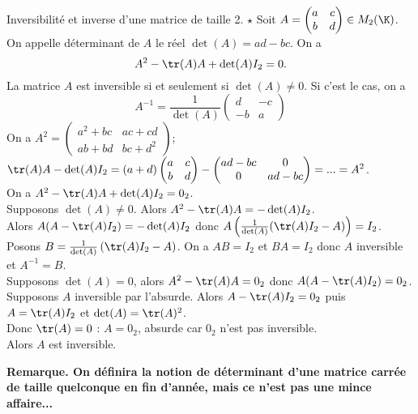 \documentclass[11pt]{article}
\begin{document}
\begin{prop}{Inversibilité et inverse d'une matrice de taille 2. $\star$}{}
    Soit $A=\begin{pmatrix}a&c\\b&d\end{pmatrix}\in M_2(\K)$. On appelle déterminant de $A$ le réel $\det(A)=ad-bc$. On a
    \begin{equation*}
        A^2-\tr(A)A+\det(A)I_2=0.
    \end{equation*}
    La matrice $A$ est inversible si et seulement si $\det(A)\neq0$. Si c'est le cas, on a
    \begin{equation*}
        A^{-1}=\frac{1}{\det(A)}\begin{pmatrix}d&-c\\-b&a\end{pmatrix}
    \end{equation*}
    \tcblower
    On a $A^2=\begin{pmatrix}a^2+bc&ac+cd\\ab+bd&bc+d^2\end{pmatrix}$; ~ $\tr(A)A-\det(A)I_2=(a+d)\begin{pmatrix}a&c\\b&d\end{pmatrix}-\begin{pmatrix}ad-bc&0\\0&ad-bc\end{pmatrix}=...=A^2$.\\
    On a $A^2-\tr(A)A+\det(A)I_2=0_2$.\\
    \boxed{\la} Supposons $\det(A)\neq0$. Alors $A^2-\tr(A)A=-\det(A)I_2$.\\
    Alors $A(A-\tr(A)I_2)=-\det(A)I_2$ donc $A\left( \frac{1}{\det(A)}(\tr(A)I_2-A) \right)=I_2$.\\
    Posons $B=\frac{1}{\det(A)}\left( \tr(A)I_2-A \right)$. On a $AB=I_2$ et $BA=I_2$ donc $A$ inversible et $A^{-1}=B$.\\
    \boxed{\ra} Supposons $\det(A)=0$, alors $A^2-\tr(A)A=0_2$ donc $A(A-\tr(A)I_2)=0_2$.\\
    Supposons $A$ inversible par l'absurde. Alors $A-\tr(A)I_2=0_2$ puis $A=\tr(A)I_2$ et $\det(A)=\tr(A)^2$.\\
    Donc $\tr(A)=0$ : $A=0_2$, absurde car $0_2$ n'est pas inversible.\\
    Alors $A$ est inversible. 
\end{prop}

\bf{Remarque.} On définira la notion de déterminant d'une matrice carrée de taille quelconque en fin d'année, mais ce n'est pas une mince affaire... 
\end{document}
